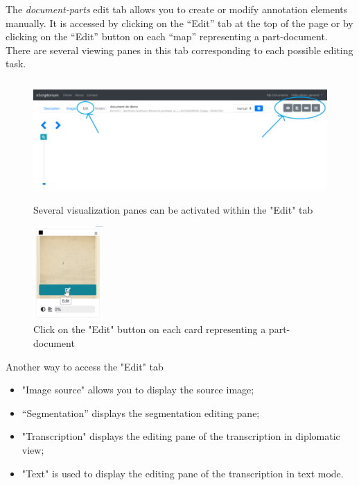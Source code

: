 \documentclass[
]{book}
\begin{document}
The \emph{document-parts} edit tab allows you to create or modify annotation
elements manually. It is accessed by clicking on the ``Edit'' tab at the
top of the page or by clicking on the ``Edit'' button on each ``map''
representing a part-document. There are several viewing panes in this
tab corresponding to each possible editing task.

\begin{figure}
\centering
\includegraphics[width=5.20833in,height=1.79167in]{img/eScrTut/image9.png}
\caption{Several visualization panes can be activated within the "Edit" tab}
\end{figure}

\begin{figure}
\centering
\includegraphics[width=1.04167in,height=1.40278in]{img/eScrTut/image10.png}
\caption{Click on the "Edit" button on each card representing a
part-document}
\end{figure}

Another way to access the "Edit" tab

\begin{itemize}
\item
  "Image source" allows you to display the source image;
\item
  ``Segmentation'' displays the segmentation editing pane;
\item
  "Transcription" displays the editing pane of the transcription in
  diplomatic view;
\item
  "Text" is used to display the editing pane of the transcription in
  text mode.
\end{itemize}
\end{document}
